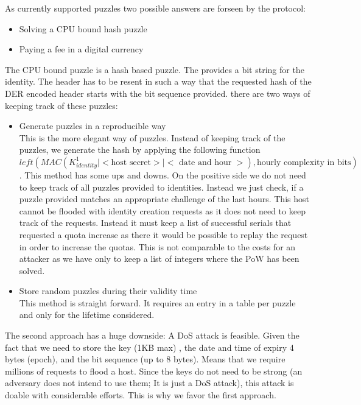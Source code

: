 As currently supported puzzles two possible answers are forseen by the protocol:
\begin{itemize}
	\item Solving a CPU bound hash puzzle 
	\item Paying a fee in a digital currency
\end{itemize}

The CPU bound puzzle is a hash based puzzle. The \VortexNode{} provides a bit string for the identity. The header has to be resent in such a way that the requested hash of the DER encoded header starts with the bit sequence provided. there are two ways of keeping track of these puzzles:

\begin{itemize}
	\item Generate puzzles in a reproducible way\\
	      This is the more elegant way of puzzles. Instead of keeping track of the puzzles, we generate the hash by applying the following function $left(MAC(K^1_{identity} | <\text{host secret}> | <\text{ date and hour }>),\text{hourly complexity in bits})$. This method has some ups and downs. On the positive side we do not need to keep track of all puzzles provided to identities. Instead we just check, if a puzzle provided matches an appropriate challenge of the last hours. This host cannot be flooded with identity creation requests as it does not need to keep track of the requests. Instead it must keep a list of successful serials that requested a quota increase as there it would be possible to replay the request in order to increase the quotas. This is not comparable to the costs for an attacker as we have only to keep a list of integers where the PoW has been solved.
	\item Store random puzzles during their validity time\\
	      This method is straight forward. It requires an entry in a table per puzzle and only for the lifetime considered. 
\end{itemize}

The second approach has a huge downside: A DoS attack is feasible. Given the fact that we need to store the key (1KB max) , the date and time of expiry 4 bytes (epoch), and the bit sequence (up to 8 bytes). Means that we require millions of requests to flood a host. Since the keys do not need to be strong (an adversary does not intend to use them; It is just a DoS attack), this attack is doable with considerable efforts. This is why we favor the first approach.

